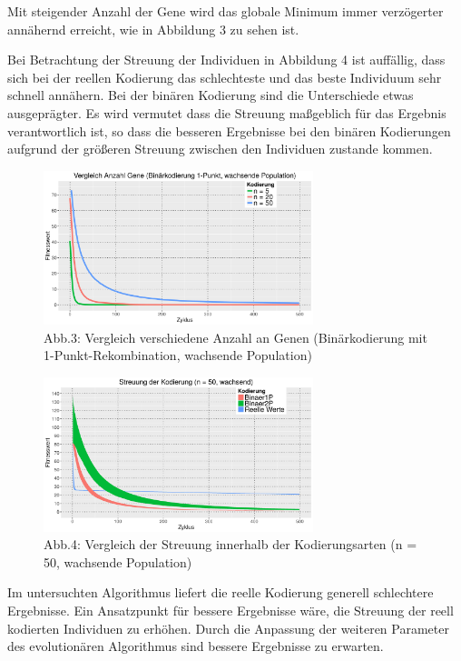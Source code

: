 \documentclass[12pt,
    a4paper,
    headinclude,
    footinclude]{scrreprt}
\begin{document}
Mit steigender Anzahl der Gene wird das globale Minimum immer verzögerter annähernd erreicht, wie in Abbildung 3 zu sehen ist.

Bei Betrachtung der Streuung der Individuen in Abbildung 4 ist auffällig, dass sich bei der reellen Kodierung das schlechteste und das beste Individuum sehr schnell annähern. Bei der binären Kodierung sind die Unterschiede etwas ausgeprägter. Es wird vermutet dass die Streuung maßgeblich für das Ergebnis verantwortlich ist, so dass die besseren Ergebnisse bei den binären Kodierungen aufgrund der größeren Streuung zwischen den Individuen zustande kommen.


\begin{figure}[H]
	\centering
	\includegraphics[width=0.7\textwidth]{../abb3_different_n.jpeg} 
	
	\caption*{Abb.3: Vergleich verschiedene Anzahl an Genen (Binärkodierung mit 1-Punkt-Rekombination, wachsende Population)} 
	\label{InputOutput}
\end{figure}


	\begin{figure}[H]
		\centering
		\includegraphics[width=0.7\textwidth]{../abb4_streuung.jpeg} 
		
		\caption*{Abb.4: Vergleich der Streuung innerhalb der Kodierungsarten (n = 50, wachsende Population)} 
		\label{InputOutput}
	\end{figure}

Im untersuchten Algorithmus liefert die reelle Kodierung generell schlechtere Ergebnisse. Ein Ansatzpunkt für bessere Ergebnisse  wäre, die Streuung der reell kodierten Individuen zu erhöhen. Durch die Anpassung  der weiteren Parameter des evolutionären Algorithmus sind bessere Ergebnisse zu erwarten. 
\end{document}
